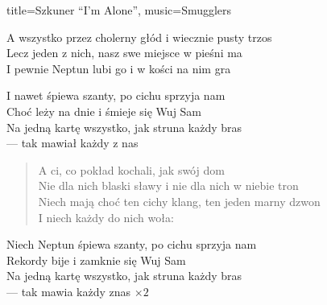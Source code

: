 \begin{song}{title={Szkuner ``I'm Alone''}, music={Smugglers}}
\begin{verse*}
        A wszystko przez cholerny głód i wiecznie pusty trzos \\
        Lecz jeden z nich, nasz  swe miejsce w pieśni ma \\
        I pewnie Neptun lubi go i w kości na nim gra
    \end{verse*}
    \begin{chorus}
        I nawet śpiewa szanty, po cichu sprzyja nam \\
        Choć leży na dnie  i śmieje się Wuj Sam \\
        Na jedną kartę wszystko, jak struna każdy bras \\
         --- tak mawiał każdy z nas
    \end{chorus}
    \begin{verse}
        A ci, co pokład  kochali, jak swój dom \\
        Nie dla nich blaski sławy i nie dla nich w niebie tron \\
        Niech mają choć ten cichy klang, ten jeden marny dzwon \\
        I niech każdy do nich woła: 
    \end{verse}
    \begin{chorus}
        Niech Neptun śpiewa szanty, po cichu sprzyja nam \\
        Rekordy bije  i zamknie się Wuj Sam \\
        Na jedną kartę wszystko, jak struna każdy bras \\
         --- tak mawia każdy znas $\times 2$
    \end{chorus}
    \begin{outro}
          
    \end{outro}
\end{song}

